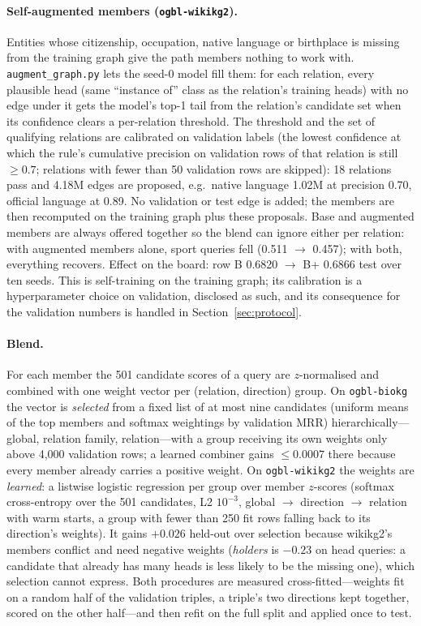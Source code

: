 \documentclass[11pt,a4paper]{article}
\begin{document}
\paragraph{Self-augmented members (\texttt{ogbl-wikikg2}).}
Entities whose citizenship, occupation, native language or birthplace is
missing from the training graph give the path members nothing to work
with. \texttt{augment\_graph.py} lets the seed-0 model fill them: for each
relation, every plausible head (same ``instance of'' class as the
relation's training heads) with no edge under it gets the model's top-1
tail from the relation's candidate set when its confidence clears a
per-relation threshold. The threshold and the set of qualifying
relations are calibrated on validation labels (the lowest confidence at
which the rule's cumulative precision on validation rows of that
relation is still $\ge0.7$; relations with fewer than 50 validation rows
are skipped): 18 relations pass and 4.18M edges are proposed, e.g.\ native
language 1.02M at precision 0.70, official language at 0.89. No
validation or test edge is added; the members are then recomputed on the
training graph plus these proposals. Base and augmented members are always
offered together so the blend can ignore either per relation: with
augmented members alone, sport queries fell (0.511 $\to$ 0.457); with
both, everything recovers. Effect on the board: row B 0.6820 $\to$ B+
0.6866 test over ten seeds. This is self-training on the training graph;
its calibration is a hyperparameter choice on validation, disclosed as
such, and its consequence for the validation numbers is handled in
Section~\ref{sec:protocol}.

\paragraph{Blend.}
For each member the 501 candidate scores of a query are $z$-normalised
and combined with one weight vector per (relation, direction) group. On
\texttt{ogbl-biokg} the vector is \emph{selected} from a fixed list of at
most nine candidates (uniform means of the top members and softmax
weightings by validation MRR) hierarchically---global, relation family,
relation---with a group receiving its own weights only above 4{,}000
validation rows; a learned combiner gains $\le0.0007$ there because every
member already carries a positive weight. On \texttt{ogbl-wikikg2} the
weights are \emph{learned}: a listwise logistic regression per group over
member $z$-scores (softmax cross-entropy over the 501 candidates, L2
$10^{-3}$, global $\to$ direction $\to$ relation with warm starts, a
group with fewer than 250 fit rows falling back to its direction's
weights). It gains $+0.026$ held-out over selection because wikikg2's
members conflict and need negative weights (\emph{holders} is $-0.23$ on
head queries: a candidate that already has many heads is less likely to
be the missing one), which selection cannot express. Both procedures are
measured cross-fitted---weights fit on a random half of the validation
triples, a triple's two directions kept together, scored on the other
half---and then refit on the full split and applied once to test.
\end{document}
